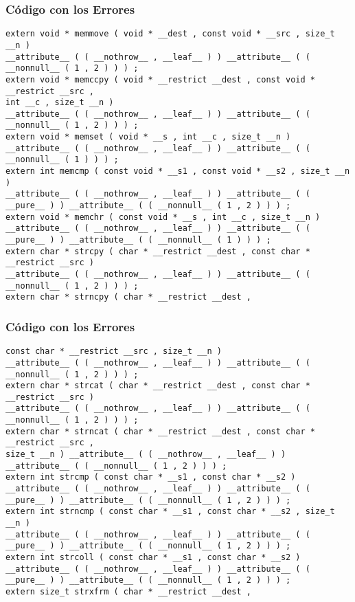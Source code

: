 \documentclass{beamer}
\begin{document}
\begin{frame}[fragile]
\frametitle{C\'odigo con los Errores}
\begin{lstlisting}[style=CStyle]
extern void * memmove ( void * __dest , const void * __src , size_t __n ) 
__attribute__ ( ( __nothrow__ , __leaf__ ) ) __attribute__ ( ( __nonnull__ ( 1 , 2 ) ) ) ; 
extern void * memccpy ( void * __restrict __dest , const void * __restrict __src , 
int __c , size_t __n ) 
__attribute__ ( ( __nothrow__ , __leaf__ ) ) __attribute__ ( ( __nonnull__ ( 1 , 2 ) ) ) ; 
extern void * memset ( void * __s , int __c , size_t __n ) __attribute__ ( ( __nothrow__ , __leaf__ ) ) __attribute__ ( ( __nonnull__ ( 1 ) ) ) ; 
extern int memcmp ( const void * __s1 , const void * __s2 , size_t __n ) 
__attribute__ ( ( __nothrow__ , __leaf__ ) ) __attribute__ ( ( __pure__ ) ) __attribute__ ( ( __nonnull__ ( 1 , 2 ) ) ) ; 
extern void * memchr ( const void * __s , int __c , size_t __n ) 
__attribute__ ( ( __nothrow__ , __leaf__ ) ) __attribute__ ( ( __pure__ ) ) __attribute__ ( ( __nonnull__ ( 1 ) ) ) ; 
extern char * strcpy ( char * __restrict __dest , const char * __restrict __src ) 
__attribute__ ( ( __nothrow__ , __leaf__ ) ) __attribute__ ( ( __nonnull__ ( 1 , 2 ) ) ) ; 
extern char * strncpy ( char * __restrict __dest , 
\end{lstlisting}
\end{frame}
\begin{frame}[fragile]
\frametitle{C\'odigo con los Errores}
\begin{lstlisting}[style=CStyle]
const char * __restrict __src , size_t __n ) 
__attribute__ ( ( __nothrow__ , __leaf__ ) ) __attribute__ ( ( __nonnull__ ( 1 , 2 ) ) ) ; 
extern char * strcat ( char * __restrict __dest , const char * __restrict __src ) 
__attribute__ ( ( __nothrow__ , __leaf__ ) ) __attribute__ ( ( __nonnull__ ( 1 , 2 ) ) ) ; 
extern char * strncat ( char * __restrict __dest , const char * __restrict __src , 
size_t __n ) __attribute__ ( ( __nothrow__ , __leaf__ ) ) __attribute__ ( ( __nonnull__ ( 1 , 2 ) ) ) ; 
extern int strcmp ( const char * __s1 , const char * __s2 ) 
__attribute__ ( ( __nothrow__ , __leaf__ ) ) __attribute__ ( ( __pure__ ) ) __attribute__ ( ( __nonnull__ ( 1 , 2 ) ) ) ; 
extern int strncmp ( const char * __s1 , const char * __s2 , size_t __n ) 
__attribute__ ( ( __nothrow__ , __leaf__ ) ) __attribute__ ( ( __pure__ ) ) __attribute__ ( ( __nonnull__ ( 1 , 2 ) ) ) ; 
extern int strcoll ( const char * __s1 , const char * __s2 ) 
__attribute__ ( ( __nothrow__ , __leaf__ ) ) __attribute__ ( ( __pure__ ) ) __attribute__ ( ( __nonnull__ ( 1 , 2 ) ) ) ; 
extern size_t strxfrm ( char * __restrict __dest , 
\end{lstlisting}
\end{frame}
\end{document}
